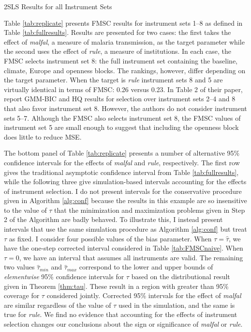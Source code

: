 \begin{table}[h]
\caption{2SLS Results for all Instrument Sets}
\label{tab:fullresults}
 \begin{center}



\end{center}

\end{table}



Table \ref{tab:replicate} presents FMSC results for instrument sets 1--8  as defined in Table \ref{tab:fullresults}. Results are presented for two cases: the first takes the effect of \emph{malfal}, a measure of malaria transmission, as the target parameter while the second uses the effect of \emph{rule}, a measure of institutions. In each case, the FMSC selects instrument set 8: the full instrument set containing the baseline, climate, Europe and openness blocks. The rankings, however, differ depending on the target parameter.  When the target is \emph{rule} instrument sets 8 and 5 are virtually identical in terms of FMSC: 0.26 versus 0.23. In Table 2 of their paper, \cite{Carstensen2006} report GMM-BIC and HQ results for selection over instrument sets 2--4 and 8 that also favor instrument set 8. However, the authors do not consider instrument sets 5--7. Although the FMSC also selects instrument set 8, the FMSC values of instrument set 5 are small enough to suggest that including the openness block does little to reduce MSE.

The bottom panel of Table \ref{tab:replicate} presents a number of alternative 95\% confidence intervals for the effects of \emph{malfal} and \emph{rule}, respectively. The first row gives the traditional asymptotic confidence interval from Table \ref{tab:fullresults}, while the following three give simulation-based intervals accounting for the effects of instrument selection. I do not present intervals for the conservative procedure given in Algorithm \ref{alg:conf} because the results in this example are so insensitive to the value of $\tau$ that the minimization and maximization problems given in Step 2 of the Algorithm are badly behaved. To illustrate this, I instead present intervals that use the same simulation procedure as Algorithm \ref{alg:conf} but treat $\tau$ as fixed. I consider four possible values of the bias parameter. When $\tau = \widehat{\tau}$, we have the one-step corrected interval considered in Table \ref{tab:FMSCnaive}. When $\tau = 0$, we have an interval that assumes all instruments are valid. The remaining two values $\widehat{\tau}_{min}$ and $\widehat{\tau}_{max}$ correspond to the lower and upper bounds of \emph{elementwise} 95\% confidence intervals for $\tau$ based on the distributional result given in Theorem \ref{thm:tau}. These result in a region with greater than 95\% coverage for $\tau$ considered jointly. Corrected 95\% intervals for the effect of \emph{malfal} are similar regardless of the value of $\tau$ used in the simulation, and the same is true for \emph{rule}. We find no evidence that accounting for the effects of instrument selection changes our conclusions about the sign or significance of \emph{malfal} or \emph{rule}.

